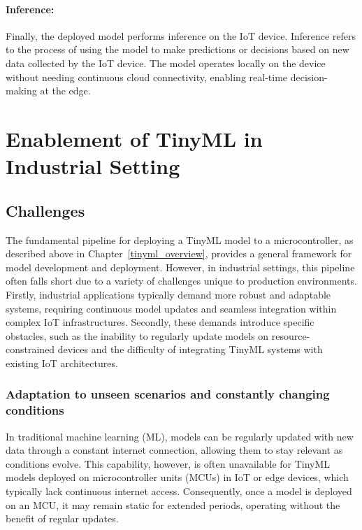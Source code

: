 \documentclass[twocolumn]{article}
\begin{document}
\paragraph{Inference:}
	Finally, the deployed model performs inference on the IoT device. Inference refers to the process of using the model to make predictions or decisions based on new data collected by the IoT device. The model operates locally on the device without needing continuous cloud connectivity, enabling real-time decision-making at the edge.\\[0.10cm]



\section{Enablement of TinyML in Industrial Setting}
\label{prod_tinyml}

\subsection{Challenges}

The fundamental pipeline for deploying a TinyML model to a microcontroller, as described above in Chapter~\ref{tinyml_overview}, provides a general framework for model development and deployment. However, in industrial settings, this pipeline often falls short due to a variety of challenges unique to production environments. Firstly, industrial applications typically demand more robust and adaptable systems, requiring continuous model updates and seamless integration within complex IoT infrastructures. Secondly, these demands introduce specific obstacles, such as the inability to regularly update models on resource-constrained devices and the difficulty of integrating TinyML systems with existing IoT architectures.

\subsubsection{Adaptation to unseen scenarios and constantly changing conditions}
In traditional machine learning (ML), models can be regularly updated with new data through a constant internet connection, allowing them to stay relevant as conditions evolve. This capability, however, is often unavailable for TinyML models deployed on microcontroller units (MCUs) in IoT or edge devices, which typically lack continuous internet access. Consequently, once a model is deployed on an MCU, it may remain static for extended periods, operating without the benefit of regular updates.\\[0.1cm]
\end{document}

